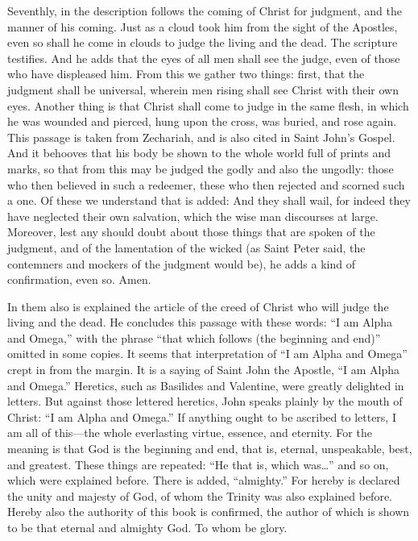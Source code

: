 Seventhly, in the description follows the coming of Christ for judgment, and the manner of his coming. Just as a cloud took him from the sight of the Apostles, even so shall he come in clouds to judge the living and the dead. The scripture testifies. And he adds that the eyes of all men shall see the judge, even of those who have displeased him. From this we gather two things: first, that the judgment shall be universal, wherein men rising shall see Christ with their own eyes. Another thing is that Christ shall come to judge in the same flesh, in which he was wounded and pierced, hung upon the cross, was buried, and rose again. This passage is taken from Zechariah, and is also cited in Saint John’s Gospel. And it behooves that his body be shown to the whole world full of prints and marks, so that from this may be judged the godly and also the ungodly: those who then believed in such a redeemer, these who then rejected and scorned such a one. Of these we understand that is added: And they shall wail, for indeed they have neglected their own salvation, which the wise man discourses at large. Moreover, lest any should doubt about those things that are spoken of the judgment, and of the lamentation of the wicked (as Saint Peter said, the contemners and mockers of the judgment would be), he adds a kind of confirmation, even so. Amen.

In them also is explained the article of the creed of Christ who will judge the living and the dead. He concludes this passage with these words: “I am Alpha and Omega,” with the phrase “that which follows (the beginning and end)” omitted in some copies. It seems that interpretation of “I am Alpha and Omega” crept in from the margin. It is a saying of Saint John the Apostle, “I am Alpha and Omega.” Heretics, such as Basilides and Valentine, were greatly delighted in letters. But against those lettered heretics, John speaks plainly by the mouth of Christ: “I am Alpha and Omega.” If anything ought to be ascribed to letters, I am all of this—the whole everlasting virtue, essence, and eternity. For the meaning is that God is the beginning and end, that is, eternal, unspeakable, best, and greatest. These things are repeated: “He that is, which was…” and so on, which were explained before. There is added, “almighty.” For hereby is declared the unity and majesty of God, of whom the Trinity was also explained before. Hereby also the authority of this book is confirmed, the author of which is shown to be that eternal and almighty God. To whom be glory.

